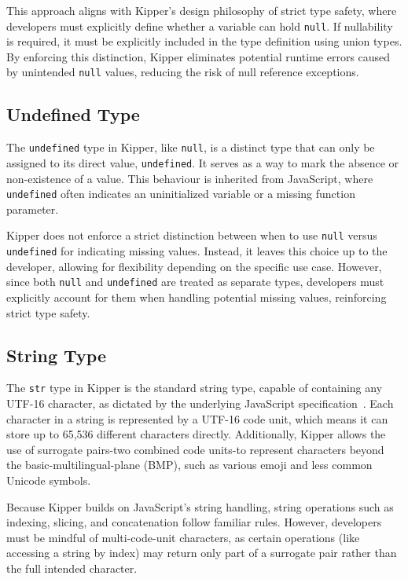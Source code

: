 This approach aligns with Kipper's design philosophy of strict type safety, where developers must explicitly define whether a variable can hold \lstinline|null|. If nullability is required, it must be explicitly included in the type definition using union types. By enforcing this distinction, Kipper eliminates potential runtime errors caused by unintended \lstinline|null| values, reducing the risk of null reference exceptions.

\subsection{Undefined Type}

The \lstinline|undefined| type in Kipper, like \lstinline|null|, is a distinct type that can only be assigned to its direct value, \lstinline|undefined|. It serves as a way to mark the absence or non-existence of a value. This behaviour is inherited from JavaScript, where \lstinline|undefined| often indicates an uninitialized variable or a missing function parameter.

Kipper does not enforce a strict distinction between when to use \lstinline|null| versus \lstinline|undefined| for indicating missing values. Instead, it leaves this choice up to the developer, allowing for flexibility depending on the specific use case. However, since both \lstinline|null| and \lstinline|undefined| are treated as separate types, developers must explicitly account for them when handling potential missing values, reinforcing strict type safety.

\subsection{String Type}

The \lstinline|str| type in Kipper is the standard string type, capable of containing any UTF-16 character, as dictated by the underlying JavaScript specification~\cite{string-mdn}. Each character in a string is represented by a UTF-16 code unit, which means it can store up to 65,536 different characters directly. Additionally, Kipper allows the use of surrogate pairs-two combined code units-to represent characters beyond the \gls{basic-multilingual-plane} (BMP), such as various emoji and less common Unicode symbols.

Because Kipper builds on JavaScript's string handling, string operations such as indexing, slicing, and concatenation follow familiar rules. However, developers must be mindful of multi-code-unit characters, as certain operations (like accessing a string by index) may return only part of a surrogate pair rather than the full intended character.

